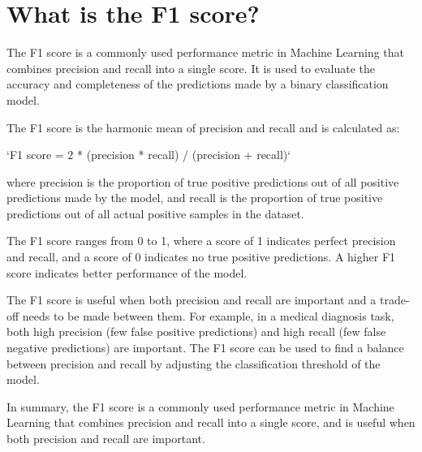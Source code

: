 \section{What is the F1 score?}
The F1 score is a commonly used performance metric in Machine Learning that combines precision and recall into a single score. It is used to evaluate the accuracy and completeness of the predictions made by a binary classification model.

The F1 score is the harmonic mean of precision and recall and is calculated as:

`F1 score = 2 * (precision * recall) / (precision + recall)`

where precision is the proportion of true positive predictions out of all positive predictions made by the model, and recall is the proportion of true positive predictions out of all actual positive samples in the dataset.

The F1 score ranges from 0 to 1, where a score of 1 indicates perfect precision and recall, and a score of 0 indicates no true positive predictions. A higher F1 score indicates better performance of the model.

The F1 score is useful when both precision and recall are important and a trade-off needs to be made between them. For example, in a medical diagnosis task, both high precision (few false positive predictions) and high recall (few false negative predictions) are important. The F1 score can be used to find a balance between precision and recall by adjusting the classification threshold of the model.

In summary, the F1 score is a commonly used performance metric in Machine Learning that combines precision and recall into a single score, and is useful when both precision and recall are important.

